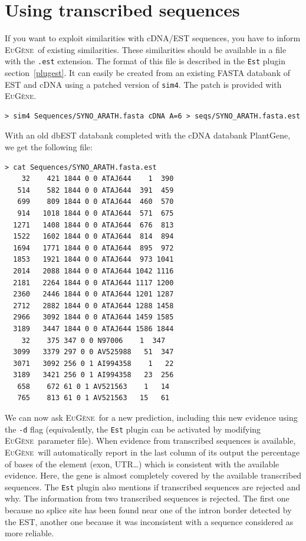\documentclass[a4paper,titlepage]{report}
\newcommand{\EuGene}{\textsc{EuG\`ene}}
\begin{document}
\section{Using transcribed sequences}

If you want to exploit similarities with cDNA/EST sequences, you have to inform \EuGene\ of existing similarities. These similarities
should be available in a file with the \texttt{.est} extension. The
format of this file is described in the \texttt{Est} plugin
section~\ref{plugest}. It can easily be created from an existing FASTA
databank of EST and cDNA using a patched version of \texttt{sim4}. The
patch is provided with \EuGene.

\begin{Verbatim}[fontsize=\scriptsize]
> sim4 Sequences/SYNO_ARATH.fasta cDNA A=6 > seqs/SYNO_ARATH.fasta.est
\end{Verbatim}

With an old dbEST databank completed with the cDNA databank PlantGene,
we get the following file:

\begin{Verbatim}[fontsize=\scriptsize]
> cat Sequences/SYNO_ARATH.fasta.est
    32    421 1844 0 0 ATAJ644    1  390
   514    582 1844 0 0 ATAJ644  391  459
   699    809 1844 0 0 ATAJ644  460  570
   914   1018 1844 0 0 ATAJ644  571  675
  1271   1408 1844 0 0 ATAJ644  676  813
  1522   1602 1844 0 0 ATAJ644  814  894
  1694   1771 1844 0 0 ATAJ644  895  972
  1853   1921 1844 0 0 ATAJ644  973 1041
  2014   2088 1844 0 0 ATAJ644 1042 1116
  2181   2264 1844 0 0 ATAJ644 1117 1200
  2360   2446 1844 0 0 ATAJ644 1201 1287
  2712   2882 1844 0 0 ATAJ644 1288 1458
  2966   3092 1844 0 0 ATAJ644 1459 1585
  3189   3447 1844 0 0 ATAJ644 1586 1844
    32    375 347 0 0 N97006    1  347
  3099   3379 297 0 0 AV525988   51  347
  3071   3092 256 0 1 AI994358    1   22
  3189   3421 256 0 1 AI994358   23  256
   658    672 61 0 1 AV521563    1   14
   765    813 61 0 1 AV521563   15   61
\end{Verbatim}

We can now ask \EuGene\ for a new prediction, including this new
evidence using the \texttt{-d} flag (equivalently, the \texttt{Est}
plugin can be activated by modifying \EuGene\ parameter file).  When
evidence from transcribed sequences is available, \EuGene\ will
automatically report in the last column of its output the percentage
of bases of the element (exon, UTR\ldots) which is consistent with the
available evidence. Here, the gene is almost completely covered by the
available transcribed sequences. The \texttt{Est} plugin also mentions
if transcribed sequences are rejected and why. The information from
two transcribed sequences is rejected. The first one because no splice
site has been found near one of the intron border detected by the EST,
another one because it was inconsistent with a sequence considered as
more reliable.
\end{document}

